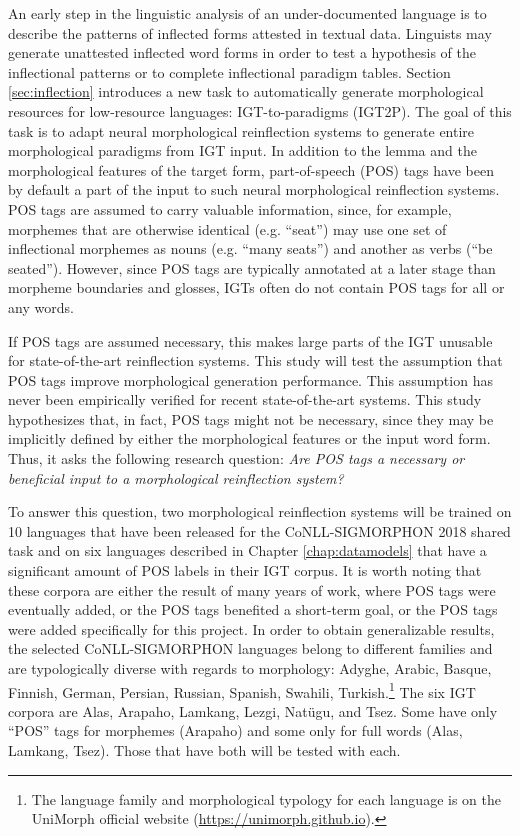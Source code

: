 An early step in the linguistic analysis of an under-documented language 
is to describe the patterns of inflected forms attested in textual data. 
Linguists may generate unattested inflected word forms in order to test a hypothesis of the inflectional patterns or to complete inflectional paradigm tables. Section \ref{sec:inflection} introduces a new task to automatically generate morphological resources for low-resource languages: IGT-to-paradigms (IGT2P).
The goal of this task is to adapt neural morphological reinflection systems to generate entire morphological paradigms from IGT input. In addition to the lemma and the morphological features of the target form, part-of-speech (POS) tags have been by default a part of the input to such neural morphological reinflection systems. POS tags are assumed to carry valuable information, since, for example, morphemes that are otherwise identical (e.g. ``seat'') may use one set of inflectional morphemes as nouns (e.g. ``many seats'') and another as verbs (``be seated''). However, since POS tags are typically annotated at a later stage than morpheme boundaries and glosses, IGTs often do not contain POS tags for all or any words.

If POS tags are assumed necessary, this makes large parts of the IGT unusable for state-of-the-art reinflection systems. This study will test the assumption that POS tags improve morphological generation performance. This assumption has never been empirically verified for recent state-of-the-art systems. This study hypothesizes that, in fact, POS tags might not be necessary, since they may be implicitly defined by either the morphological features or the input word form. 
Thus,
it asks the following research question: \textit{Are POS tags a necessary or beneficial input to a morphological reinflection system?} 

To answer this question, two morphological reinflection systems will be trained on 10 languages that have been released for the CoNLL-SIGMORPHON 2018 shared task \citep{cotterell-etal-2018-conll} and on six languages described in Chapter \ref{chap:datamodels} that have a significant amount of POS labels in their IGT corpus. It is worth noting that these corpora are either the result of many years of work, where POS tags were eventually added, or the POS tags benefited a short-term goal, or the POS tags were added specifically for this project. In order to obtain generalizable results, the selected CoNLL-SIGMORPHON languages belong to different families and are typologically diverse with regards to morphology: Adyghe, Arabic, Basque, Finnish, German, Persian, Russian, Spanish, Swahili, Turkish.\footnote{The language family and morphological typology for each language is on the UniMorph official website (\url{https://unimorph.github.io}).} The six IGT corpora are Alas, Arapaho, Lamkang, Lezgi, Natügu, and Tsez. Some have only ``POS'' tags for morphemes (Arapaho) and some only for full words (Alas, Lamkang, Tsez). Those that have both will be tested with each. 

